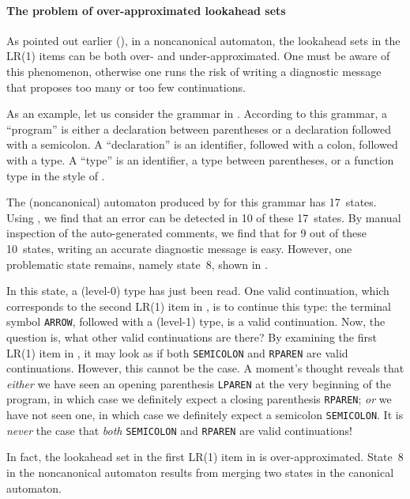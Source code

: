 \documentclass[onecolumn,11pt,nocopyrightspace,preprint]{sigplanconf}
\begin{document}
\paragraph{The problem of over-approximated lookahead sets}

As pointed out earlier (), in a noncanonical
automaton, the lookahead sets in the LR(1) items can be both over- and
under-approximated. One must be aware of this phenomenon, otherwise one runs
the risk of writing a diagnostic message that proposes too many or too few
continuations.

As an example, let us consider the grammar in .
According to this grammar, a ``program'' is either a declaration between
parentheses or a declaration followed with a semicolon. A ``declaration'' is
an identifier, followed with a colon, followed with a type. A ``type'' is an
identifier, a type between parentheses, or a function type in the style of
\ocaml.

The (noncanonical) automaton produced by \menhir for this grammar has 17~states.
Using \olisterrors, we find that an error can be detected in 10 of these
17~states. By manual inspection of the auto-generated comments, we find that
for 9 out of these 10~states, writing an accurate diagnostic message is easy. However,
one problematic state remains, namely state~8,
shown in .

In this state, a (level-0) type has just been read. One valid continuation,
which corresponds to the second LR(1) item in ,
is to continue this type: the terminal symbol \verb+ARROW+, followed with a
(level-1) type, is a valid continuation. Now, the question is, what other
valid continuations are there? By examining the first LR(1) item
in , it may look as if both \verb+SEMICOLON+
and \verb+RPAREN+ are valid continuations. However, this cannot be the case. A
moment's thought reveals that \emph{either} we have seen an opening
parenthesis \verb+LPAREN+ at the very beginning of the program, in which case
we definitely expect a closing parenthesis \verb+RPAREN+; \emph{or} we have
not seen one, in which case we definitely expect a semicolon \verb+SEMICOLON+.
It is \emph{never} the case that \emph{both} \verb+SEMICOLON+
and \verb+RPAREN+ are valid continuations!

In fact, the lookahead set in the first LR(1) item
in  is over-approximated.
State~8 in the noncanonical automaton results from merging two states
in the canonical automaton.
\end{document}
